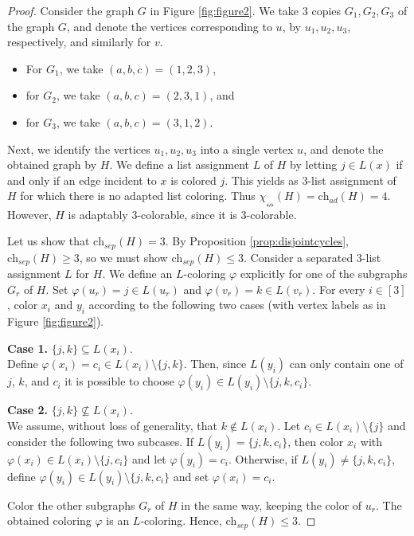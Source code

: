 \documentclass[12pt]{article}
\newcommand{\single}{\chi_{\nleftrightarrow}}
\newcommand{\ch}{\mathrm{ch}}
\newcommand{\chsep}{\mathrm{ch}_{sep}}
\begin{document}
\begin{proof}
	Consider the graph $G$ in Figure \ref{fig:figure2}.
	We take $3$ copies $G_1, G_2, G_3$ of the graph $G$, and denote 
    the vertices corresponding to $u$, by $u_1, u_2, u_3$, respectively, and similarly for $v$.
\begin{itemize}
	
	\item For $G_1$, we take $(a,b,c)=(1,2,3)$,

	\item for $G_2$, we take $(a,b,c) = (2,3,1)$, and

	\item for $G_3$, we take $(a,b,c) = (3,1,2)$.

\end{itemize}
	Next, we identify the vertices $u_1, u_2, u_3$ into a single vertex $u$, and denote the obtained
	graph by $H$. We define a list assignment $L$ of $H$ by letting $j \in L(x)$ if and only if
	an edge incident to $x$ is colored $j$. This yields as $3$-list assignment of $H$ for which 
	there is no adapted list coloring.
	Thus $\single(H)= \ch_{ad}(H)=4$.
	However, $H$ is adaptably $3$-colorable, since it is $3$-colorable.

    Let us show that $\chsep(H)=3$. By Proposition \ref{prop:disjointcycles}, 
    $\chsep(H)\geq 3$, so we must show $\chsep(H)\leq3$. 
    Consider a separated $3$-list assignment $L$ for $H$. We define 
    an $L$-coloring $\varphi$ explicitly for one of the subgraphs 
    $G_r$ of $H$. Set $\varphi(u_r)=j\in L(u_r)$ and 
$\varphi(v_r)=k\in L(v_r)$. For every $i\in [3]$, color $x_i$ and $y_i$ according to the 
    following two cases (with vertex labels as in Figure \ref{fig:figure2}).

    \vspace{\baselineskip}

    \textbf{Case 1.} $\{j,k\}\subseteq L(x_i)$. \hfill \\
    Define $\varphi(x_i)=c_i\in L(x_i)\setminus\{j,k\}$. Then, since $L(y_i)$ can only contain one of $j$, $k$, and $c_i$ it is possible to choose $\varphi(y_i)\in L(y_i)\setminus\{j,k,c_i\}$. 

    \vspace{\baselineskip}
    
    \textbf{Case 2.} $\{j,k\}\nsubseteq L(x_i)$. \hfill \\
    We assume, without loss of generality, that $k\notin L(x_i)$. Let $c_i\in L(x_i)\setminus\{j\}$ and consider the following two subcases. If $L(y_i)=\{j,k,c_i\}$, then color $x_i$ with $\varphi(x_i)\in L(x_i)\setminus \{j,c_i\}$ and let $\varphi(y_i)=c_i$. Otherwise, if $L(y_i)\neq\{j,k,c_i\}$, define $\varphi(y_i)\in L(y_i)\setminus\{j,k,c_i\}$ and set $\varphi(x_i)=c_i$. 

    \vspace{\baselineskip}
    
    Color the other subgraphs $G_r$ of $H$ in the same way, keeping the color of $u_r$. 
The obtained coloring $\varphi$ is an $L$-coloring. Hence, $\chsep(H)\leq3$.
\end{proof}
	
\end{document}
